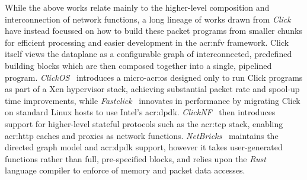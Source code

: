 While the above works relate mainly to the higher-level composition and interconnection of network functions, a long lineage of works drawn from \emph{Click}~\parencite{DBLP:conf/sosp/MorrisKJK99} have instead focussed on how to build these packet programs from smaller chunks for efficient processing and easier development in the \gls{acr:nfv} framework.
Click itself views the dataplane as a configurable graph of interconnected, predefined building blocks which are then composed together into a single, pipelined program.
\emph{ClickOS}~\parencite{DBLP:conf/nsdi/MartinsAROHBH14} introduces a micro-\gls{acr:os} designed only to run Click programs as part of a Xen hypervisor stack, achieving substantial packet rate and spool-up time improvements, while \emph{Fastclick}~\parencite{DBLP:conf/ancs/BarbetteSM15} innovates in performance by migrating Click on standard Linux hosts to use Intel's \gls{acr:dpdk}.
\emph{ClickNF}~\parencite{DBLP:conf/usenix/GalloL18} then introduces support for higher-level stateful protocols such as the \gls{acr:tcp} stack, enabling \gls{acr:http} caches and proxies as network functions.
\emph{NetBricks}~\parencite{DBLP:conf/osdi/PandaHJWRS16} maintains the directed graph model and \gls{acr:dpdk} support, however it takes user-generated functions rather than full, pre-specified blocks, and relies upon the \emph{Rust}~\parencite{rust} language compiler to enforce of memory and packet data accesses.


